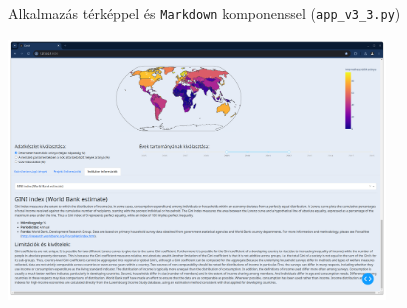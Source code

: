 \documentclass[english, aspectratio=169]{beamer}
\begin{document}
\begin{frame}{Alkalmazás térképpel és \texttt{Markdown} komponenssel (\texttt{app\_v3\_3.py})}
	\begin{center}
		\includegraphics[width=10cm, height=7cm, keepaspectratio]{images/scatter_32.png}
	\end{center}
\end{frame}
\end{document}
